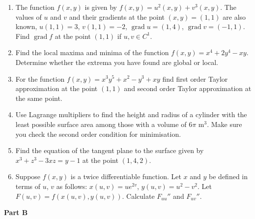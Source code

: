 \documentclass[12pt]{article} %
\theoremstyle{definition} %
\DeclareMathOperator{\grad}{grad}
\providecommand{\grad}{\mathrm{grad}\,}
\begin{document}
\begin{enumerate}

\item The function $f(x,y)$ is given by $f(x,y)=u^2(x,y)+v^3(x,y)$. The values of $u$ and $v$ and their gradients at the point $(x,y)=(1,1)$ are also known, $u(1,1)=3$, $v(1,1)=-2$, $\grad u=(1,4)$, $\grad v=(-1,1)$. Find $\grad f$ at the point $(1,1)$ if $u,v \in C^1$.

\item Find the local maxima and minima of the function $f(x,y)=x^4+2y^4-xy$. Determine whether the extrema you have found are global or local.

\item For the function $f(x,y)=x^3y^5+x^2-y^3+xy$ find first order Taylor approximation at the point $(1,1)$ and second order Taylor approximation at the same point.

\item Use Lagrange multipliers to find the height and radius of a cylinder with the least possible
surface area among those with a volume of $6\pi$ m$^3$. Make sure you check the second order
condition for minimisation.

\item Find the equation of the tangent plane to the surface given by $x^3+z^3-3xz=y-1$ at the point $(1, 4, 2)$.

\item Suppose $f(x,y)$ is a twice differentiable function. Let $x$ and $y$ be defined in terms of $u$, $v$ as follows: $x(u,v)=ue^{2v}$, $y(u,v)=u^2-v^2$. Let $F(u,v)=f(x(u, v), y(u, v))$.
Calculate $F_{uu}''$ and $F_{uv}''$.

\end{enumerate}

\textbf{Part B}
\end{document}
